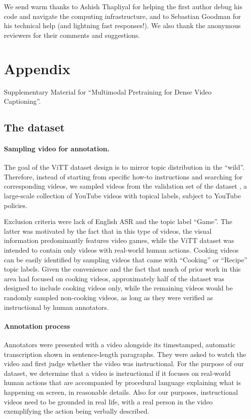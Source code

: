 \documentclass[11pt,a4paper]{article}
\begin{document}
We send warm thanks to Ashish Thapliyal for helping the first author debug his code and navigate the computing infrastructure, and to Sebastian Goodman for his technical help (and lightning fast responses!). 
We also thank the anonymous reviewers for their comments and suggestions.




\clearpage

\appendix

\section{Appendix}
Supplementary Material for ``Multimodal Pretraining for Dense Video Captioning''.
\subsection{The \ldvm dataset}
\label{sec:data_app}
\paragraph{Sampling video for annotation.}
The goal of the ViTT dataset design is to mirror topic distribution in the ``wild''. Therefore, instead of starting from specific how-to instructions and searching for corresponding videos, we sampled videos from the validation set of the \ytdata dataset \citep{abu2016youtube},  
a large-scale collection of YouTube videos with topical labels, subject to YouTube policies.


Exclusion criteria were lack of English ASR and the topic label ``Game''. The latter was motivated by the fact that in this type of videos, the visual information predominantly features video games, while the ViTT dataset was intended to contain only  videos with real-world human actions.
Cooking videos can be easily identified by sampling videos that came with ``Cooking'' or ``Recipe'' topic labels.  Given the convenience and the fact that much of prior work in this area had focused on cooking videos, approximately half of the dataset was designed to include cooking videos only, while the remaining videos would be randomly sampled non-cooking videos, as long as they were verified as instructional by human annotators.  





\paragraph{Annotation process}
Annotators were presented with a video alongside its timestamped, automatic transcription shown in sentence-length paragraphs.
They were asked to watch the video and first judge whether the video was instructional. For the purpose of our dataset, we determine that a video is instructional if it focuses on real-world human actions that are accompanied by procedural language explaining what is happening on screen, in reasonable details. Also for our purposes, instructional videos need to be grounded in real life, with a real person in the video exemplifying the action being verbally described.
  
\end{document}
